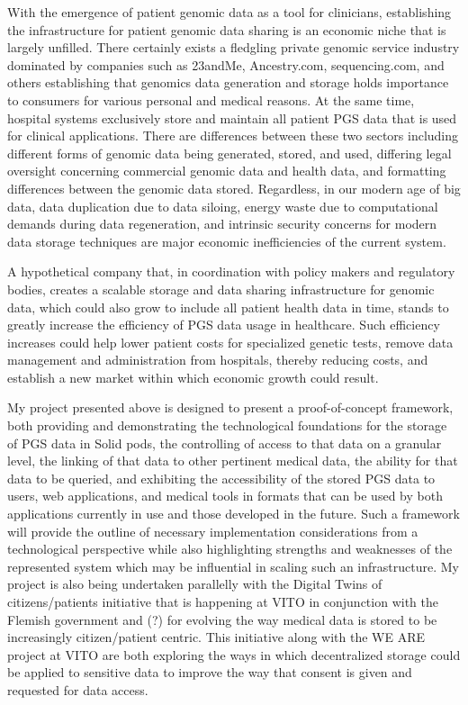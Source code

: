 \documentclass[runningheads]{llncs}
\begin{document}
With the emergence of patient genomic data as a tool for clinicians, establishing the infrastructure for patient genomic data sharing is an economic niche that is largely unfilled. 
There certainly exists a fledgling private genomic service industry dominated by companies such as 23andMe, Ancestry.com, sequencing.com, and others establishing that genomics data generation and storage holds importance to consumers for various personal and medical reasons. 
At the same time, hospital systems exclusively store and maintain all patient PGS data that is used for clinical applications. 
There are differences between these two sectors including different forms of genomic data being generated, stored, and used, differing legal oversight concerning commercial genomic data and health data, and formatting differences between the genomic data stored. 
Regardless, in our modern age of big data, data duplication due to data siloing, energy waste due to computational demands during data regeneration, and intrinsic security concerns for modern data storage techniques are major economic inefficiencies of the current system. 

A hypothetical company that, in coordination with policy makers and regulatory bodies, creates a scalable storage and data sharing infrastructure for genomic data, which could also grow to include all patient health data in time, stands to greatly increase the efficiency of PGS data usage in healthcare. 
Such efficiency increases could help lower patient costs for specialized genetic tests, remove data management and administration from hospitals, thereby reducing costs, and establish a new market within which economic growth could result. 

My project presented above is designed to present a proof-of-concept framework, both providing and demonstrating the technological foundations for the storage of PGS data in Solid pods, the controlling of access to that data on a granular level, the linking of that data to other pertinent medical data, the ability for that data to be queried, and exhibiting the accessibility of the stored PGS data to users, web applications, and medical tools in formats that can be used by both applications currently in use and those developed in the future. 
Such a framework will provide the outline of necessary implementation considerations from a technological perspective while also highlighting strengths and weaknesses of the represented system which may be influential in scaling such an infrastructure. 
My project is also being undertaken parallelly with the Digital Twins of citizens/patients initiative that is happening at VITO in conjunction with the Flemish government and (?) for evolving the way medical data is stored to be increasingly citizen/patient centric. 
This initiative along with the WE ARE project at VITO are both exploring the ways in which decentralized storage could be applied to sensitive data to improve the way that consent is given and requested for data access. 
\end{document}
